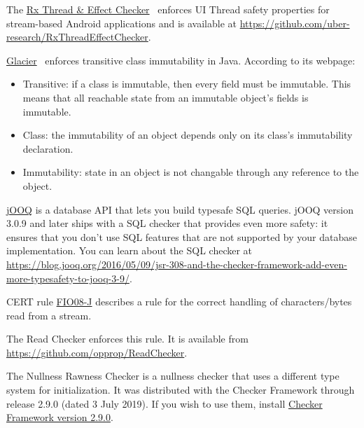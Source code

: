 The \href{https://plv.colorado.edu/benno/ase18.pdf}{Rx Thread \& Effect Checker}~\cite{SteinCSC2018} enforces
UI Thread safety properties for stream-based Android applications and is available at
\url{https://github.com/uber-research/RxThreadEffectChecker}.



\href{http://mcoblenz.github.io/Glacier/}{Glacier}~\cite{CoblenzNAMS2017}
enforces transitive class immutability in Java.  According to its webpage:

\begin{itemize}
\item
  Transitive: if a class is immutable, then every field must be
  immutable. This means that all reachable state from an immutable object's
  fields is immutable.
\item
  Class: the immutability of an object depends only on its class's
  immutability declaration.
\item
  Immutability: state in an object is not changable through any reference to
  the object.
\end{itemize}



\href{http://www.jooq.org/}{jOOQ} is a database API that lets you build
typesafe SQL queries.  jOOQ version 3.0.9 and later ships with a SQL
checker that provides even more safety:  it ensures that you don't
use SQL features that are not supported by your database
implementation.  You can learn about the SQL checker at
\url{https://blog.jooq.org/2016/05/09/jsr-308-and-the-checker-framework-add-even-more-typesafety-to-jooq-3-9/}.



CERT
rule \href{https://www.securecoding.cert.org/confluence/display/java/FIO08-J.+Distinguish+between+characters+or+bytes+read+from+a+stream+and+-1}{FIO08-J}
describes a rule for the correct handling of characters/bytes read
from a stream.

The Read Checker enforces this rule.
It is available from
\url{https://github.com/opprop/ReadChecker}.



The Nullness Rawness Checker is a nullness checker that uses a different type system for initialization.
It was distributed with the Checker Framework through release 2.9.0 (dated 3 July 2019). If you wish
to use them, install \href{https://checkerframework.org/releases/2.9.0/}{Checker Framework version 2.9.0}.


